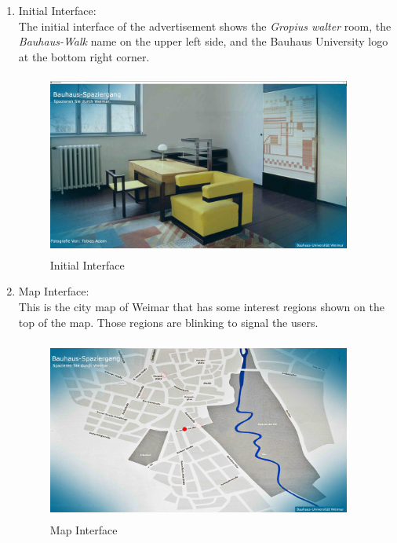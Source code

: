 \begin{enumerate}

\item Initial Interface: \\
The initial interface of the advertisement shows the \emph{Gropius walter} room, the \emph{Bauhaus-Walk} name on the upper left side, and the Bauhaus University logo at the bottom right corner.

\begin{figure}[H]
    \centering
    \includegraphics[width=100mm,height=60mm]{Figures/7/initialpage}
    \caption{Initial Interface}%
    \label{fig:adInitialpage}%
\end{figure}

\item Map Interface: \\
This is the city map of Weimar that has some interest regions shown on the top of the map. Those regions are blinking to signal the users.

\begin{figure}[H]
    \centering
    \includegraphics[width=100mm,height=60mm]{Figures/7/map}
    \caption{Map Interface}%
    \label{fig:adSecondpage1}%
\end{figure}


\end{enumerate}
